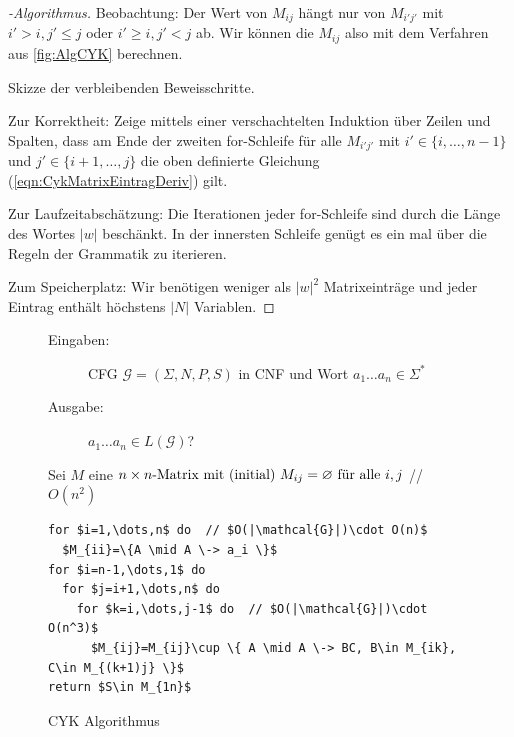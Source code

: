 \begin{proof}[-Algorithmus]
	Beobachtung: Der Wert von $M_{ij}$ hängt nur von $M_{i'j'}$ mit $i'>i, j'\leq j$ oder $i'\geq i,j'<j$ ab.
	Wir können die $M_{ij}$ also mit dem Verfahren aus \autoref{fig:AlgCYK} berechnen.
	
	
	Skizze der verbleibenden Beweisschritte.
	
	Zur Korrektheit: Zeige mittels einer verschachtelten Induktion über Zeilen und Spalten, 
	dass am Ende der zweiten for-Schleife für alle $M_{i'j'}$ mit $i'\in\{i,\ldots, n-1\}$ und $j'\in\{i+1,\ldots, j\}$
	die oben definierte Gleichung (\ref{eqn:CykMatrixEintragDeriv}) gilt.
	
	Zur Laufzeitabschätzung: Die Iterationen jeder for-Schleife sind durch die Länge des Wortes $|w|$ beschänkt. 
	In der innersten Schleife genügt es ein mal über die Regeln der Grammatik zu iterieren.
	
	Zum Speicherplatz: Wir benötigen weniger als $|w|^2$ Matrixeinträge 
	und jeder Eintrag enthält höchstens $|N|$ Variablen.
	\qedhere
\end{proof}


\begin{figure}
	\small
	\begin{description}
		\item[Eingaben:] \ac{CFG} $\mathcal{G} = (\Sigma, N, P, S)$ in CNF und Wort $a_1\ldots a_n\in\Sigma^*$
		\item[Ausgabe:]  $a_1\ldots a_n\in L(\mathcal{G})$?
	\end{description}
	
	Sei $M$  eine $n\times n\text{-Matrix mit (initial) } M_{ij}=\varnothing \text{ für alle } i, j$  // $O(n^2)$
	
	\begin{center}
		\begin{minipage}{12cm}
			\begin{lstlisting}[mathescape,morekeywords={for,do,return},morecomment={[l]{//}}]
for $i=1,\dots,n$ do  // $O(|\mathcal{G}|)\cdot O(n)$
  $M_{ii}=\{A \mid A \-> a_i \}$
for $i=n-1,\dots,1$ do
  for $j=i+1,\dots,n$ do
    for $k=i,\dots,j-1$ do  // $O(|\mathcal{G}|)\cdot O(n^3)$
      $M_{ij}=M_{ij}\cup \{ A \mid A \-> BC, B\in M_{ik}, C\in M_{(k+1)j} \}$
return $S\in M_{1n}$
			\end{lstlisting}
			\qedherefixlstlisting
		\end{minipage}
	\end{center}
	
	\caption{CYK Algorithmus}
	\label{fig:AlgCYK}
\end{figure}


